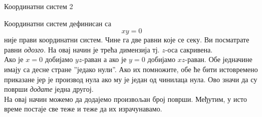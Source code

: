 ﻿\documentclass[en]{./../../common/SurferDesc}%
\begin{document}
\footnotesize
%

\begin{surferPage}
  \begin{surferTitle}Координатни систем 2\end{surferTitle}
   \begin{surferText}
   
Координатни систем дефинисан са  
\[xy=0\]
није прави координатни систем. Чине га две равни које се секу. Ви посматрате равни {\it одозго}. На овај начин је трећа димензија тј. $z$-оса сакривена. \\
\vspace{0.3cm}
Ако је $x=0$ добијамо $yz$-раван а ако је $y=0$ добијамо $xz$-раван.
Обе једначине имају са десне стране ''једако нули''. Ако их помножите, обе ће бити истовремено приказане јер је производ нула ако му је један од чинилаца нула. Ово значи да су површи  {\it додате} једна другој. \\
На овај начин можемо да додајемо произвољан број површи. Међутим, у исто време постаје све теже и теже да их израчунавамо.
\end{surferText}
\end{surferPage}
\end{document}
